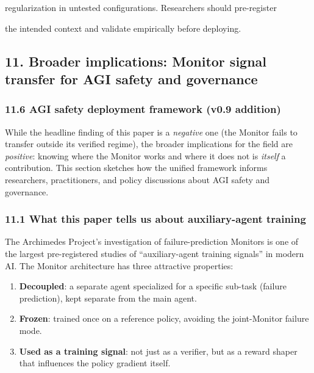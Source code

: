 \documentclass[11pt]{article}
\begin{document}
regularization in untested configurations. Researchers should
pre-register

the intended context and validate empirically before deploying.

\subsection{11. Broader implications: Monitor signal transfer for AGI
safety and
governance}\label{broader-implications-monitor-signal-transfer-for-agi-safety-and-governance}

\subsubsection{11.6 AGI safety deployment framework (v0.9
addition)}\label{agi-safety-deployment-framework-v0.9-addition}

While the headline finding of this paper is a \emph{negative} one (the
Monitor fails to transfer outside its verified regime), the broader
implications for the field are \emph{positive}: knowing where the
Monitor works and where it does not is \emph{itself} a contribution.
This section sketches how the unified framework informs researchers,
practitioners, and policy discussions about AGI safety and governance.

\subsubsection{11.1 What this paper tells us about auxiliary-agent
training}\label{what-this-paper-tells-us-about-auxiliary-agent-training}

The Archimedes Project's investigation of failure-prediction Monitors is
one of the largest pre-registered studies of ``auxiliary-agent training
signals'' in modern AI. The Monitor architecture has three attractive
properties:

\begin{enumerate}
\def\labelenumi{\arabic{enumi}.}

\item
  \textbf{Decoupled}: a separate agent specialized for a specific
  sub-task (failure prediction), kept separate from the main agent.
\item
  \textbf{Frozen}: trained once on a reference policy, avoiding the
  joint-Monitor failure mode.
\item
  \textbf{Used as a training signal}: not just as a verifier, but as a
  reward shaper that influences the policy gradient itself.
\end{enumerate}
\end{document}

